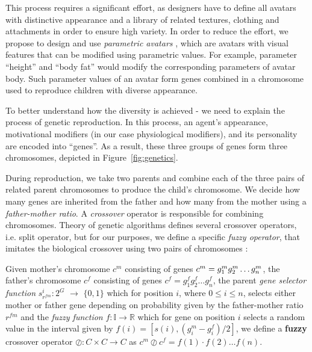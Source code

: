 \documentclass[graybox]{svmult}
\begin{document}
This process requires a significant effort, as designers have to define all avatars with distinctive appearance and a library of related textures, clothing and attachments in order to ensure high variety. In order to reduce the effort, we propose to design and use \textit{parametric avatars} \cite{lewis2000a} \cite{trescak2012v}, which are avatars with visual features that can be modified using parametric values. For example, parameter ``height'' and ``body fat'' would modify the corresponding parameters of avatar body. Such parameter values of an avatar form genes combined in a chromosome used to reproduce children with diverse appearance.

To better understand how the diversity is achieved - we need to explain the process of genetic reproduction. In this process, an agent's appearance, motivational modifiers (in our case physiological modifiers), and its personality are encoded into ``genes''. As a result, these three groups of genes form three chromosomes, depicted in Figure~\ref{fig:genetics}.



   

During reproduction, we take two parents and combine each of the three pairs of related parent chromosomes to produce the child's chromosome. We decide how many genes are inherited from the father and how many from the mother using a \textit{father-mother ratio}. A \textit{crossover} operator is responsible for combining chromosomes. Theory of genetic algorithms defines several crossover operators, i.e. split operator, but for our purposes, we define a specific \textit{fuzzy operator}, that imitates the biological crossover using two pairs of chromosomes \cite{vieira10}:


\begin{definition}
Given mother's chromosome $c^m$ consisting of genes $c^m = g_{1}^{m}g_{2}^{m} \ldots \\ g_{n}^{m}$, the father's chromosome $c^f$ consisting of genes $c^f = g_{1}^{f}g_{2}^{f} \ldots g_{n}^{f}$, the parent \textit{gene selector function} $s_{r^{fm}}^{i}: 2^G$ $\rightarrow$ $\{0, 1\}$ which for position $i$, where $0 \leq i \leq n$,  selects either mother or father gene depending on probability given by the father-mother ratio $r^{fm}$ and the \textit{fuzzy function} $f: \mathbb{I} \rightarrow \mathbb{R}$ which for gene on position $i$ selects a random value in the interval given by $f(i) = [s(i), (g_{i}^{m}-g_{i}^{f}) / 2]$, we define a \textbf{fuzzy} crossover operator $\oslash: C \times C \rightarrow C$ as $c^m \oslash c^f = f(1) \cdot f(2) \ldots f(n)$.
\end{definition}  
\end{document}
